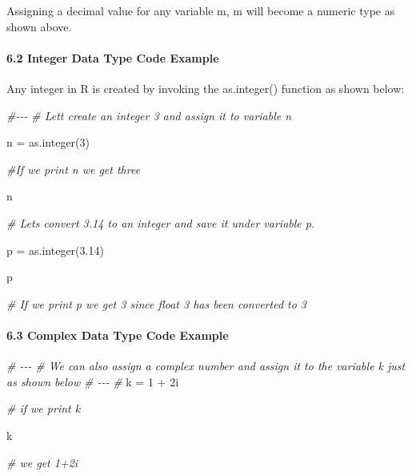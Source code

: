 \documentclass[
]{article}
\newenvironment{Shaded}{\begin{snugshade}}{\end{snugshade}}
\newcommand{\CommentTok}[1]{\textcolor[rgb]{0.56,0.35,0.01}{\textit{#1}}}
\newcommand{\DecValTok}[1]{\textcolor[rgb]{0.00,0.00,0.81}{#1}}
\newcommand{\FloatTok}[1]{\textcolor[rgb]{0.00,0.00,0.81}{#1}}
\newcommand{\FunctionTok}[1]{\textcolor[rgb]{0.00,0.00,0.00}{#1}}
\newcommand{\NormalTok}[1]{#1}
\newcommand{\OtherTok}[1]{\textcolor[rgb]{0.56,0.35,0.01}{#1}}
\newcommand{\SpecialCharTok}[1]{\textcolor[rgb]{0.00,0.00,0.00}{#1}}
\begin{document}
Assigning a decimal value for any variable m, m will become a numeric
type as shown above.

\hypertarget{integer-data-type-code-example}{%
\paragraph{6.2 Integer Data Type Code
Example}\label{integer-data-type-code-example}}

Any integer in R is created by invoking the as.integer() function as
shown below:

\begin{Shaded}
\begin{Highlighting}[]
\CommentTok{\#{-}{-}{-}}
\CommentTok{\# Let\textquotesingle{}t create an integer 3 and assign it to variable n}

\NormalTok{n }\OtherTok{=} \FunctionTok{as.integer}\NormalTok{(}\DecValTok{3}\NormalTok{)}

\CommentTok{\#If we print n we get three}

\NormalTok{n}


\CommentTok{\# Let\textquotesingle{}s convert 3.14 to an integer and save it under variable p.}

\NormalTok{p }\OtherTok{=} \FunctionTok{as.integer}\NormalTok{(}\FloatTok{3.14}\NormalTok{)}

\NormalTok{p}

\CommentTok{\# If we print p we get 3 since float 3 has been converted to 3}
\end{Highlighting}
\end{Shaded}

\hypertarget{complex-data-type-code-example}{%
\paragraph{6.3 Complex Data Type Code
Example}\label{complex-data-type-code-example}}

\begin{Shaded}
\begin{Highlighting}[]
\CommentTok{\# {-}{-}{-}}
\CommentTok{\# We can also assign a complex number and assign it to the variable k just as shown below}
\CommentTok{\# {-}{-}{-}}
\CommentTok{\# }
\NormalTok{k }\OtherTok{=} \DecValTok{1} \SpecialCharTok{+}\NormalTok{ 2i  }

\CommentTok{\# if we print k}

\NormalTok{k}

\CommentTok{\# we get 1+2i}

\end{Highlighting}
\end{Shaded}
\end{document}
